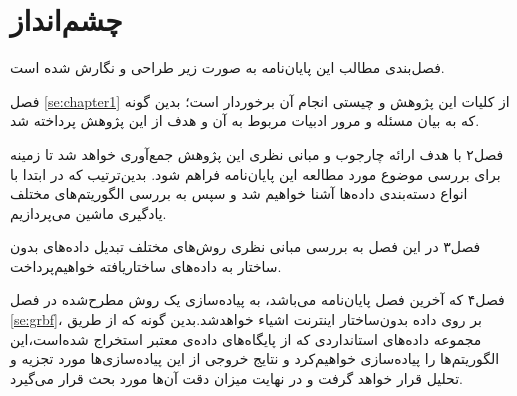 \section{چشم‌انداز} 
فصل‌بندی مطالب این پایان‌نامه به صورت زیر طراحی و نگارش شده است.

فصل 
\ref{se:chapter1}
از کلیات این پژوهش و چیستی انجام آن برخوردار است؛ بدین گونه که به بیان مسئله و مرور ادبیات مربوط به آن و هدف از این پژوهش پرداخته شد.

 فصل۲
با هدف ارائه چارجوب و مبانی نظری این پژوهش جمع‌آوری خواهد‌ شد تا زمینه برای بررسی موضوع مورد مطالعه این پایان‌نامه فراهم شود. بدین‌ترتیب که در ابتدا با انواع دسته‌بندی داده‌ها آشنا خواهیم شد و سپس به بررسی الگوریتم‌های مختلف یادگیری ماشین می‌پردازیم. 

فصل۳
در این فصل به بررسی مبانی نظری روش‌های مختلف تبدیل داده‌های بدون ساختار به داده‌های ساختاریافته خواهیم‌پرداخت.


فصل۴
که آخرین فصل پایان‌نامه می‌باشد، به پیاده‌سازی یک روش مطرح‌شده در فصل \ref{se:grbf}، بر روی داده‌ بدون‌ساختار اینترنت اشیاء خواهد‌شد.بدین گونه که از طریق مجموعه داده‌های استانداردی که از پایگاه‌های داده‌ی معتبر استخراج‌ شده‌است،این الگوریتم‌ها را پیاده‌سازی خواهیم‌کرد و نتایج خروجی از این پیاده‌سازی‌ها مورد تجزیه و تحلیل قرار‌ خواهد گرفت و در نهایت میزان دقت آن‌ها مورد بحث قرار ‌می‌گیرد.


 
